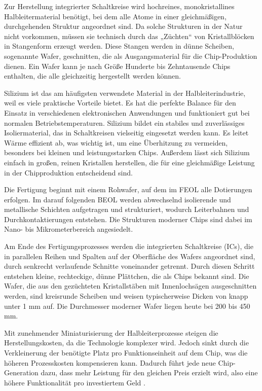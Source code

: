 Zur Herstellung integrierter Schaltkreise wird hochreines, monokristallines Halbleitermaterial benötigt, bei dem alle Atome in einer gleichmäßigen, durchgehenden Struktur angeordnet sind. Da solche Strukturen in der Natur nicht vorkommen, müssen sie technisch durch das „Züchten“ von Kristallblöcken in Stangenform erzeugt werden. Diese Stangen werden in dünne Scheiben, sogenannte Wafer, geschnitten, die als Ausgangsmaterial für die Chip-Produktion dienen. Ein Wafer kann je nach Größe Hunderte bis Zehntausende Chips enthalten, die alle gleichzeitig hergestellt werden können.

Silizium ist das am häufigsten verwendete Material in der Halbleiterindustrie, weil es viele praktische Vorteile bietet. Es hat die perfekte Balance für den Einsatz in verschiedenen elektronischen Anwendungen und funktioniert gut bei normalen Betriebstemperaturen. Silizium bildet ein stabiles und zuverlässiges Isoliermaterial, das in Schaltkreisen vielseitig eingesetzt werden kann. Es leitet Wärme effizient ab, was wichtig ist, um eine Überhitzung zu vermeiden, besonders bei kleinen und leistungsstarken Chips. Außerdem lässt sich Silizium einfach in großen, reinen Kristallen herstellen, die für eine gleichmäßige Leistung in der Chipproduktion entscheidend sind.

Die Fertigung beginnt mit einem Rohwafer, auf dem im \ac{FEOL} alle Dotierungen erfolgen. Im darauf folgenden \ac{BEOL} werden abwechselnd isolierende und metallische Schichten aufgetragen und strukturiert, wodurch Leiterbahnen und Durchkontaktierungen entstehen. Die Strukturen moderner Chips sind dabei im Nano- bis Mikrometerbereich angesiedelt.

Am Ende des Fertigungsprozesses werden die integrierten Schaltkreise (\acp{IC}), die in parallelen Reihen und Spalten auf der Oberfläche des Wafers angeordnet sind, durch senkrecht verlaufende Schnitte voneinander getrennt. Durch diesen Schritt entstehen kleine, rechteckige, dünne Plättchen, die als Chips bekannt sind. Die Wafer, die aus den gezüchteten Kristallstäben mit Innenlochsägen ausgeschnitten werden, sind kreisrunde Scheiben und weisen typischerweise Dicken von knapp unter 1 mm auf. Die Durchmesser moderner Wafer liegen heute bei 200 bis 450 mm.

Mit zunehmender Miniaturisierung der Halbleiterprozesse steigen die Herstellungskosten, da die Technologie komplexer wird. Jedoch sinkt durch die Verkleinerung der benötigte Platz pro Funktionseinheit auf dem Chip, was die höheren Prozesskosten kompensieren kann. Dadurch führt jede neue Chip-Generation dazu, dass mehr Leistung für den gleichen Preis erzielt wird, also eine höhere Funktionalität pro investiertem Geld \cite{lienig2023halbleitertechnologie}.
